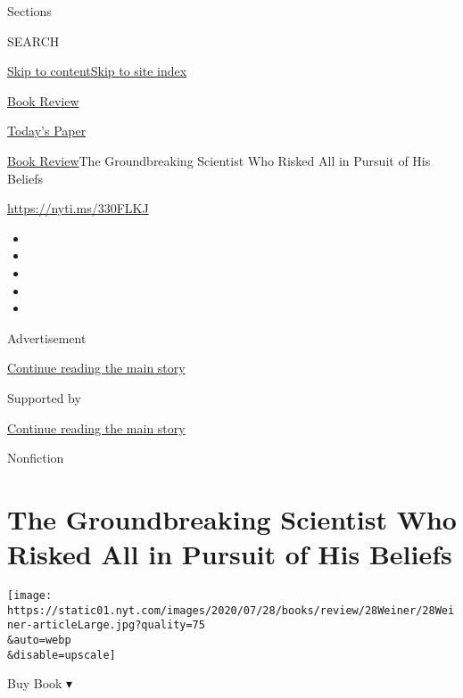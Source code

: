 Sections

SEARCH

\protect\hyperlink{site-content}{Skip to
content}\protect\hyperlink{site-index}{Skip to site index}

\href{https://www.nytimes.com/section/books/review}{Book Review}

\href{https://myaccount.nytimes.com/auth/login?response_type=cookie\&client_id=vi}{}

\href{https://www.nytimes.com/section/todayspaper}{Today's Paper}

\href{/section/books/review}{Book Review}\textbar{}The Groundbreaking
Scientist Who Risked All in Pursuit of His Beliefs

\url{https://nyti.ms/330FLKJ}

\begin{itemize}
\item
\item
\item
\item
\item
\end{itemize}

Advertisement

\protect\hyperlink{after-top}{Continue reading the main story}

Supported by

\protect\hyperlink{after-sponsor}{Continue reading the main story}

Nonfiction

\hypertarget{the-groundbreaking-scientist-who-risked-all-in-pursuit-of-his-beliefs}{%
\section{The Groundbreaking Scientist Who Risked All in Pursuit of His
Beliefs}\label{the-groundbreaking-scientist-who-risked-all-in-pursuit-of-his-beliefs}}

\texttt{[image: https://static01.nyt.com/images/2020/07/28/books/review/28Weiner/28Weiner-articleLarge.jpg?quality=75\\\&auto=webp\\\&disable=upscale]}

Buy Book ▾

